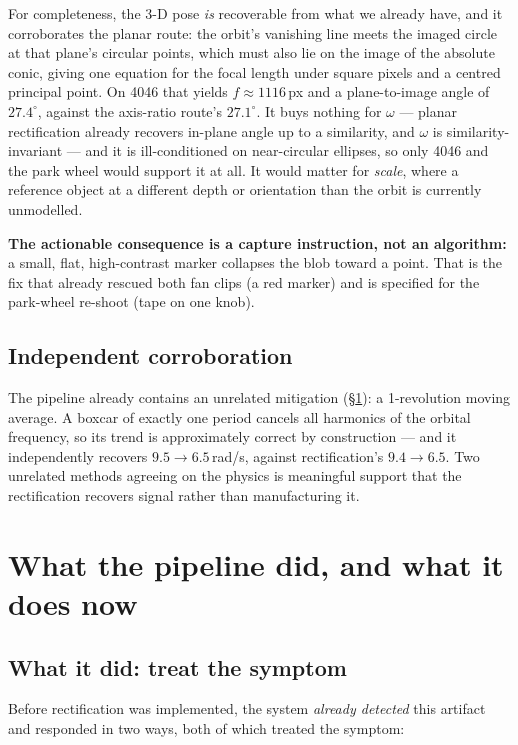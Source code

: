 \documentclass[11pt,a4paper]{article}
\begin{document}
For completeness, the 3-D pose \emph{is} recoverable from what we already have, and it corroborates
the planar route: the orbit's vanishing line meets the imaged circle at that plane's circular
points, which must also lie on the image of the absolute conic, giving one equation for the focal
length under square pixels and a centred principal point. On 4046 that yields $f \approx 1116$\,px
and a plane-to-image angle of $27.4^\circ$, against the axis-ratio route's $27.1^\circ$. It buys
nothing for $\omega$ --- planar rectification already recovers in-plane angle up to a similarity,
and $\omega$ is similarity-invariant --- and it is ill-conditioned on near-circular ellipses, so
only 4046 and the park wheel would support it at all. It would matter for \emph{scale}, where a
reference object at a different depth or orientation than the orbit is currently unmodelled.

\textbf{The actionable consequence is a capture instruction, not an algorithm:} a small, flat,
high-contrast marker collapses the blob toward a point. That is the fix that already rescued both
fan clips (a red marker) and is specified for the park-wheel re-shoot (tape on one knob).

\subsection{Independent corroboration}

The pipeline already contains an unrelated mitigation (\S\ref{sec:filter}): a 1-revolution
moving average. A boxcar of exactly one period cancels all harmonics of the orbital frequency,
so its trend is approximately correct by construction --- and it independently recovers
$9.5 \rightarrow 6.5$\,rad/s, against rectification's $9.4 \rightarrow 6.5$. Two unrelated
methods agreeing on the physics is meaningful support that the rectification recovers signal
rather than manufacturing it.

\section{What the pipeline did, and what it does now}
\label{sec:filter}

\subsection{What it did: treat the symptom}

Before rectification was implemented, the system \emph{already detected} this artifact and
responded in two ways, both of which treated the symptom:
\end{document}
